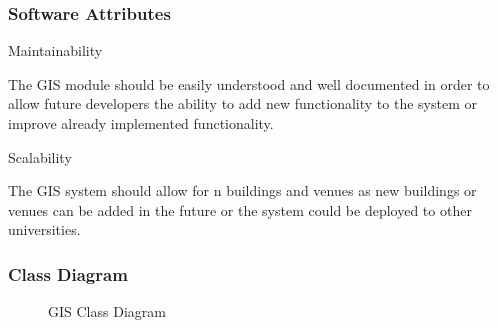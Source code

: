 \subsubsection{Software Attributes}
	
Maintainability

The GIS module should be easily understood and well documented in order to allow future developers the ability to add new functionality to the system or improve already implemented functionality.

Scalability

The GIS system should allow for n buildings and venues as new buildings or venues can be added in the future or the system could be deployed to other universities.


 

\subsubsection{Class Diagram}

	\begin{figure}[h!]


\caption{GIS Class Diagram}

	\end{figure}